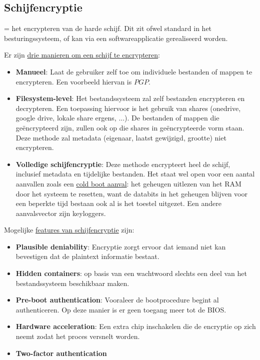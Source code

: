 \documentclass{report}
\begin{document}

	\subsection{Schijfencryptie}
	= het encrypteren van de harde schijf. Dit zit ofwel standard in het besturingssysteem, of kan via een softwareapplicatie gerealiseerd worden.

	Er zijn \underline{drie manieren om een schijf te encrypteren}:
	\begin{itemize}
		\item \textbf{Manueel}: Laat de gebruiker zelf toe om individuele bestanden of mappen te encrypteren. Een voorbeeld hiervan is $PGP$.
		\item \textbf{Filesystem-level}: Het bestandssysteem zal zelf bestanden encrypteren en decrypteren. Een toepassing hiervoor is het gebruik van shares (onedrive, google drive, lokale share ergens, ...). De bestanden of mappen die geëncrypteerd zijn, zullen ook op die shares in geëncrypteerde vorm staan. Deze methode zal metadata (eigenaar, laatst gewijzigd, grootte) niet encrypteren.
		\item \textbf{Volledige schijfencryptie}: Deze methode encrypteert heel de schijf, inclusief metadata en tijdelijke bestanden. Het staat wel open voor een aantal aanvallen zoals een \underline{cold boot aanval}: het geheugen uitlezen van het RAM door het systeem te resetten, want de databits in het geheugen blijven voor een beperkte tijd bestaan ook al is het toestel uitgezet. Een andere aanvalsvector zijn keyloggers.
	\end{itemize}
	Mogelijke \underline{features van schijfencryptie} zijn:
	\begin{itemize}
		\item \textbf{Plausible deniability}: Encryptie zorgt ervoor dat iemand niet kan bevestigen dat de plaintext informatie bestaat.
		\item \textbf{Hidden containers}: op basis van een wachtwoord slechts een deel van het bestandssysteem beschikbaar maken.
		\item \textbf{Pre-boot authentication}: Vooraleer de bootprocedure begint al authenticeren. Op deze manier is er geen toegang meer tot de BIOS.
		\item \textbf{Hardware acceleration}: Een extra chip inschakelen die de encryptie op zich neemt zodat het proces versnelt worden.
		\item \textbf{Two-factor authentication}
	\end{itemize}
\end{document}
